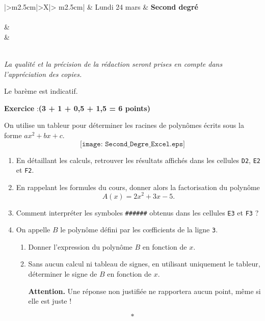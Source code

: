 \documentclass[12pt,french]{article}
\newcounter{exoc}
\newenvironment{exoc}[1]{%
  \refstepcounter{exoc}\textbf{Exercice \theexoc} :\hfill {\textbf{(#1)}}\par
  \medskip}%
{\medskip}
\begin{document}
\pieddepage{}{}{}

\begin{center}
\begin{tabularx}{\textwidth}{|>\centering m{2.5cm}|>\centering X|>{\centering\arraybackslash} m{2.5cm}|}
	\iere {} &  Lundi 24 mars  & \textbf{Second degré} \\
	\hline
		 \\
	\hline
         &  \\
		 &  \\
	\hline
         \\[1cm]
    \hline
\end{tabularx}\bigskip

{\itshape
La qualité et la précision de la rédaction seront prises en compte dans l'appréciation des copies.\par
Le barème est indicatif.
}
\end{center}

\begin{exoc}{3 + 1 + 0,5 + 1,5 = 6 points}
    On utilise un tableur pour déterminer les racines de polynômes écrits sous la forme $ax^2 + bx+c$.
    \[\texttt{[image: Second\_Degre\_Excel.eps]}\]
    \begin{enumerate}
        \item En détaillant les calculs, retrouver les résultats affichés dans les cellules \verb!D2!, \verb!E2! et \verb!F2!.
        \item En rappelant les formules du cours, donner alors la factorisation du polynôme \[A(x) = 2x^2 + 3x - 5.\]
        \item Comment interpréter les symboles \verb!######! obtenus dans les cellules \verb!E3! et \verb!F3! ?
        \item On appelle $B$ le polynôme défini par les c{\oe}fficients de la ligne \verb!3!.
            \begin{enumerate}
                \item Donner l'expression du polynôme $B$ en fonction de $x$.
                \item Sans aucun calcul ni tableau de signes, en utilisant uniquement le tableur, déterminer le signe de $B$ en fonction de $x$.\par \textbf{Attention.} Une réponse non justifiée ne rapportera aucun point, même si elle est juste !
            \end{enumerate}
    \end{enumerate}
\end{exoc}\[*\]
\end{document}
